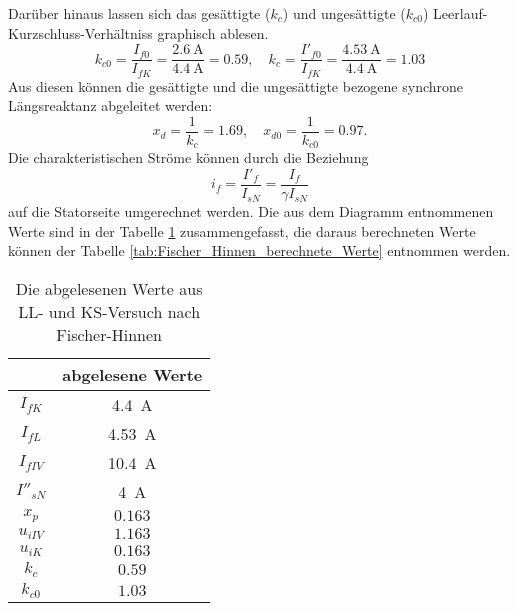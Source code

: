 Darüber hinaus lassen sich das gesättigte ($k_ {c}$) und ungesättigte ($k_ {c0}$) Leerlauf-Kurzschluss-Verhältniss graphisch ablesen.
\begin{equation*}
    k_ {c0} = \frac{I_{f0}}{I_{fK}} = \frac{\SI{2.6}{\ampere}}{\SI{4.4}{\ampere}} = 0.59, \quad k_ {c} = \frac{I'_{f0}}{I_{fK}} = \frac{\SI{4.53}{\ampere}}{\SI{4.4}{\ampere}} = 1.03
\end{equation*}
Aus diesen können die gesättigte und die ungesättigte bezogene synchrone Längsreaktanz abgeleitet werden:
\begin{equation*}
    x_d = \frac{1}{k_c} = 1.69, \quad x_{d0} = \frac{1}{k_{c0}} = 0.97.
\end{equation*}
Die charakteristischen Ströme können durch die Beziehung
\begin{equation*}
    i_f = \frac{I'_f}{I_{sN}} = \frac{I_f}{\gamma I_{sN}}
\end{equation*}
auf die Statorseite umgerechnet werden. Die aus dem Diagramm entnommenen Werte sind in der Tabelle \ref{tab:Fischer_Hinnen_abgelesene_Werte} zusammengefasst, die daraus berechneten Werte können der Tabelle \ref{tab:Fischer_Hinnen_berechnete_Werte} entnommen werden.

\begin{table}[!ht]
\centering
\begin{tabular}{|c|c|}
\hline
            & abgelesene Werte      \\ \hline
$I_{fK}$    &  \SI{4.4}{\ampere}    \\ \hline
$I_{fL}$    & \SI{4.53}{\ampere}    \\ \hline
$I_{fIV}$   & \SI{10.4}{\ampere}    \\ \hline
$I''_{sN}$  & \SI{4}{\ampere}       \\ \hline
$x_p$       & $0.163$               \\ \hline
$u_{iIV}$   & $1.163$               \\ \hline
$u_{iK}$    & $0.163$               \\ \hline
$k_c$       & $0.59$                \\ \hline
$k_{c0}$    & $1.03$                \\ \hline
\end{tabular}
\caption{Die abgelesenen Werte aus LL- und KS-Versuch nach Fischer-Hinnen}
\label{tab:Fischer_Hinnen_abgelesene_Werte}
\end{table}

